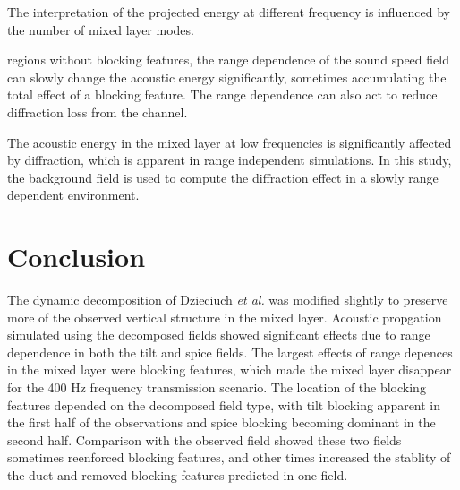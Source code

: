 \documentclass[preprint,NumberedRefs]{JASA}
\begin{document}
The interpretation of the projected energy at different frequency is influenced by the number of mixed layer modes.


 regions without blocking features, the range dependence of the sound speed field can slowly change the acoustic energy significantly, sometimes accumulating the total effect of a blocking feature. The range dependence can also act to reduce diffraction loss from the channel.

The acoustic energy in the mixed layer at low frequencies is significantly affected by diffraction, which is apparent in range independent simulations. In this study, the background field is used to compute the diffraction effect in a slowly range dependent environment.

\section{Conclusion}\label{sec:conclusion}
The dynamic decomposition of Dzieciuch \emph{et al.} was modified slightly to preserve more of the observed vertical structure in the mixed layer. Acoustic propgation simulated using the decomposed fields showed significant effects due to range dependence in both the tilt and spice fields. The largest effects of range depences in the mixed layer were blocking features, which made the mixed layer disappear for the 400 Hz frequency transmission scenario. The location of the blocking features depended on the decomposed field type, with tilt blocking apparent in the first half of the observations and spice blocking becoming dominant in the second half. Comparison with the observed field showed these two fields sometimes reenforced blocking features, and other times increased the stablity of the duct and removed blocking features predicted in one field.




\end{document}
